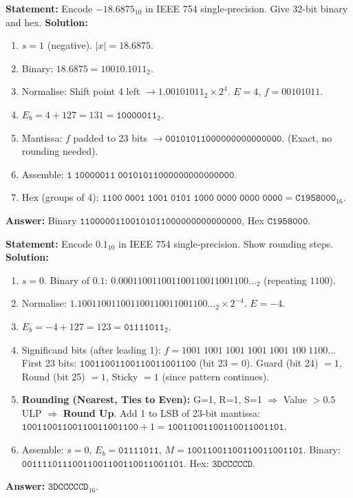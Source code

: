 \documentclass[11pt]{article}
\begin{document}
\begin{exoresolu}
\textbf{Statement:} Encode $-18.6875_{10}$ in IEEE 754 single‑precision. Give 32‑bit binary and hex.
\tcblower
\textbf{Solution:}
\begin{enumerate}
    \item $s = 1$ (negative). $|x| = 18.6875$.
    \item Binary: $18.6875 = 10010.1011_2$.
    \item Normalise: Shift point 4 left $\to 1.00101011_2 \times 2^4$. $E = 4$, $f = 00101011$.
    \item $E_b = 4 + 127 = 131 = \mathtt{10000011}_2$.
    \item Mantissa: $f$ padded to 23 bits $\to \mathtt{00101011000000000000000}$. (Exact, no rounding needed).
    \item Assemble: $\mathtt{1\;10000011\;00101011000000000000000}$.
    \item Hex (groups of 4): $\mathtt{1100\;0001\;1001\;0101\;1000\;0000\;0000\;0000} = \mathtt{C1958000}_{16}$.
\end{enumerate}
\textbf{Answer:} Binary $\mathtt{11000001100101011000000000000000}$, Hex $\mathtt{C1958000}$.
\end{exoresolu}

\begin{exoresolu}
\textbf{Statement:} Encode $0.1_{10}$ in IEEE 754 single‑precision. Show rounding steps.
\tcblower
\textbf{Solution:}
\begin{enumerate}
    \item $s = 0$. Binary of $0.1$: $0.000110011001100110011001100\dots_2$ (repeating $1100$).
    \item Normalise: $1.100110011001100110011001100\dots_2 \times 2^{-4}$. $E = -4$.
    \item $E_b = -4 + 127 = 123 = \mathtt{01111011}_2$.
    \item Significand bits (after leading 1):
        $f = 1001\;1001\;1001\;1001\;1001\;100\;1100\dots$
        First 23 bits: $\mathtt{10011001100110011001100}$ (bit 23 = 0).
        Guard (bit 24) $= 1$, Round (bit 25) $= 1$, Sticky $= 1$ (since pattern continues).
    \item \textbf{Rounding (Nearest, Ties to Even):} G=1, R=1, S=1 $\Rightarrow$ Value $> 0.5$ ULP $\Rightarrow$ \textbf{Round Up}.
        Add 1 to LSB of 23-bit mantissa:
        $\mathtt{10011001100110011001100} + 1 = \mathtt{10011001100110011001101}$.
    \item Assemble: $s=0$, $E_b=\mathtt{01111011}$, $M=\mathtt{10011001100110011001101}$.
        Binary: $\mathtt{00111101110011001100110011001101}$.
        Hex: $\mathtt{3DCCCCCD}$.
\end{enumerate}
\textbf{Answer:} $\mathtt{3DCCCCCD}_{16}$.
\end{exoresolu}
\end{document}
